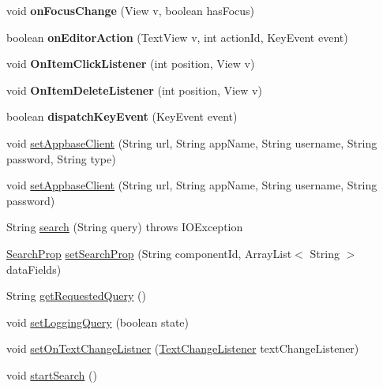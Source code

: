 \begin{DoxyCompactItemize}
void {\bfseries on\+Focus\+Change} (View v, boolean has\+Focus)
\item 
\mbox{\label{classcom_1_1example_1_1searchwidget_1_1_search_bar_a2475a3f619ffe2b0d010e4c14a0a1025}} 
boolean {\bfseries on\+Editor\+Action} (Text\+View v, int action\+Id, Key\+Event event)
\item 
\mbox{\label{classcom_1_1example_1_1searchwidget_1_1_search_bar_a8ed52376e01a1777559c5dc1f5d3a695}} 
void {\bfseries On\+Item\+Click\+Listener} (int position, View v)
\item 
\mbox{\label{classcom_1_1example_1_1searchwidget_1_1_search_bar_aa5cf65345d66fd669f0af9de500005cc}} 
void {\bfseries On\+Item\+Delete\+Listener} (int position, View v)
\item 
\mbox{\label{classcom_1_1example_1_1searchwidget_1_1_search_bar_aee224a53845c6480afcf0589aabbf2e8}} 
boolean {\bfseries dispatch\+Key\+Event} (Key\+Event event)
\item 
void \mbox{\hyperlink{classcom_1_1example_1_1searchwidget_1_1_search_bar_aeee8a868bca0435ece56efb35e84602d}{set\+Appbase\+Client}} (String url, String app\+Name, String username, String password, String type)
\item 
void \mbox{\hyperlink{classcom_1_1example_1_1searchwidget_1_1_search_bar_a4a4eddac44d1c06f0ac24e31dd653a79}{set\+Appbase\+Client}} (String url, String app\+Name, String username, String password)
\item 
String \mbox{\hyperlink{classcom_1_1example_1_1searchwidget_1_1_search_bar_a3ccff2a33e4f3bba007aa04840265b47}{search}} (String query)  throws I\+O\+Exception 
\item 
\mbox{\hyperlink{classcom_1_1example_1_1searchwidget_1_1_builder_1_1_search_prop}{Search\+Prop}} \mbox{\hyperlink{classcom_1_1example_1_1searchwidget_1_1_search_bar_a4adb569b19b3f944775531927ab378cf}{set\+Search\+Prop}} (String component\+Id, Array\+List$<$ String $>$ data\+Fields)
\item 
String \mbox{\hyperlink{classcom_1_1example_1_1searchwidget_1_1_search_bar_a4e9189e7948cfa925689c3aea179b3a5}{get\+Requested\+Query}} ()
\item 
void \mbox{\hyperlink{classcom_1_1example_1_1searchwidget_1_1_search_bar_ad7ebfb25a69de44d845b39a130edcbed}{set\+Logging\+Query}} (boolean state)
\item 
void \mbox{\hyperlink{classcom_1_1example_1_1searchwidget_1_1_search_bar_afe1c0fa7bdb6574a8c22229de073fa2f}{set\+On\+Text\+Change\+Listner}} (\mbox{\hyperlink{interfacecom_1_1example_1_1searchwidget_1_1_search_bar_1_1_text_change_listener}{Text\+Change\+Listener}} text\+Change\+Listener)
\item 
void \mbox{\hyperlink{classcom_1_1example_1_1searchwidget_1_1_search_bar_a8cdd994a66ea763883b6d3ed89d2d299}{start\+Search}} ()
\end{DoxyCompactItemize}
